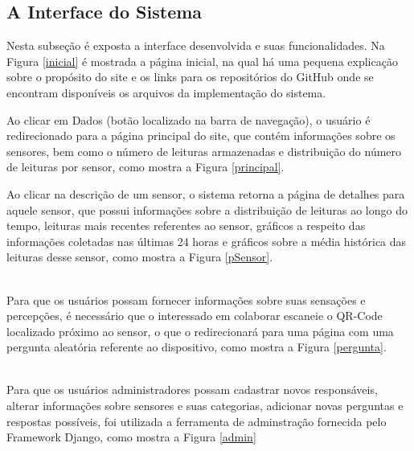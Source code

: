 \subsection{A Interface do Sistema}
\null \quad Nesta subseção é exposta a interface desenvolvida e suas funcionalidades. Na Figura \ref{inicial}
é mostrada a página inicial, na qual há uma pequena explicação sobre o propósito do site e os links para os repositórios do GitHub onde se encontram disponíveis os arquivos da implementação do sistema.

\newpage
\null \quad Ao clicar em Dados (botão localizado na barra de navegação), o usuário é redirecionado para a página principal do site, que contém informações sobre os sensores, bem como o número de leituras armazenadas e distribuição do número de leituras por sensor, como mostra a Figura \ref{principal}.


\null \quad Ao clicar na descrição de um sensor, o sistema retorna a página de detalhes para aquele sensor, que possui informações sobre a distribuição de leituras ao longo do tempo, leituras mais recentes referentes ao sensor, gráficos a respeito das informações coletadas nas últimas 24 horas e gráficos sobre a média histórica das leituras desse sensor, como mostra a Figura \ref{pSensor}.



\\\null \quad Para que os usuários possam fornecer informações sobre suas sensações e percepções, é necessário que o interessado em colaborar escaneie o QR-Code localizado próximo ao sensor, o que o redirecionará para uma página com uma pergunta aleatória referente ao dispositivo, como mostra a Figura \ref{pergunta}.


\\\null \quad Para que os usuários administradores possam cadastrar novos responsáveis, alterar informações sobre sensores e suas categorias, adicionar novas perguntas e respostas possíveis, foi utilizada a ferramenta de adminstração fornecida pelo Framework Django, como mostra a Figura \ref{admin}



